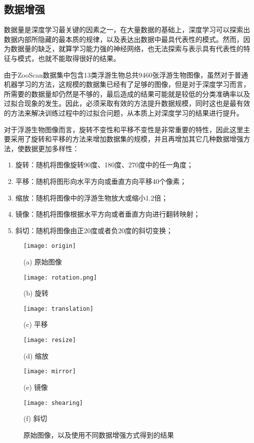 \subsection{数据增强}

数据量是深度学习最关键的因素之一，在大量数据的基础上，深度学习可以探索出数据内部所隐藏的最本质的规律，以及表达出数据中最具代表性的模式。然而，因为数据量的缺乏，就算学习能力强的神经网络，也无法探索与表示具有代表性的特征与模式，也就不能取得很好的结果。

由于ZooScan数据集中包含13类浮游生物总共9460张浮游生物图像，虽然对于普通机器学习的方法，这规模的数据集已经有了足够的图像，但是对于深度学习而言，所需要的数据量却仍然是不够的，最后造成的结果可能就是较低的分类准确率以及过拟合现象的发生。因此，必须采取有效的方法提升数据规模，同时这也是最有效的方法来解决训练过程中的过拟合问题，从本质上对深度学习的结果进行提升。

对于浮游生物图像而言，旋转不变性和平移不变性是非常重要的特性，因此这里主要采用了旋转和平移的方法来增加数据集的规模，并且再增加其它几种数据增强方法，使数据更加多样性：

\begin{enumerate}
\item 旋转：随机将图像旋转90度、180度、270度中的任一角度；
\item 平移：随机将图形向水平方向或垂直方向平移40个像素；
\item 缩放：随机将图像中的浮游生物放大或缩小1.2倍；
\item 镜像：随机将图像根据水平方向或者垂直方向进行翻转映射；
\item 斜切：随机将图像由正20度或者负20度的斜切变换；
\end{enumerate}

\begin{figure}[H]
\centering
\begin{minipage}[]{0.3\linewidth} 
      \centering 
      \texttt{[image: origin]}
        \centerline{(a) 原始图像}\medskip
\end{minipage}
  \begin{minipage}[]{0.3\linewidth}
    \centering
    \texttt{[image: rotation.png]}
      \centerline{(b) 旋转}\medskip
  \end{minipage}
  \begin{minipage}[]{0.3\linewidth}
    \centering
    \texttt{[image: translation]}
      \centerline{(c) 平移}\medskip
  \end{minipage}
\begin{minipage}[]{0.3\linewidth} 
      \centering 
      \texttt{[image: resize]}
        \centerline{(d) 缩放}\medskip
\end{minipage}
  \begin{minipage}[]{0.3\linewidth}
    \centering
    \texttt{[image: mirror]}
      \centerline{(e) 镜像}\medskip
  \end{minipage}
  \begin{minipage}[]{0.3\linewidth}
    \centering
    \texttt{[image: shearing]}
      \centerline{(f) 斜切}\medskip
  \end{minipage}
  \caption{原始图像，以及使用不同数据增强方式得到的结果}
\label{fig:augmentation}
\end{figure}

